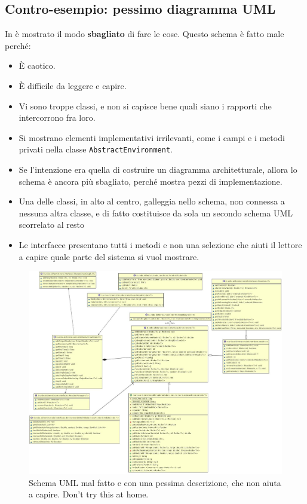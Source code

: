 \documentclass[a4paper,12pt]{report}
\begin{document}
\subsection*{Contro-esempio: pessimo diagramma UML}

In  è mostrato il modo \textbf{sbagliato} di fare le cose.
%
Questo schema è fatto male perché:
\begin{itemize}
	\item È caotico.
	\item È difficile da leggere e capire.
	\item Vi sono troppe classi, e non si capisce bene quali siano i rapporti che intercorrono fra loro.
	\item Si mostrano elementi implementativi irrilevanti, come i campi e i metodi privati nella classe \texttt{AbstractEnvironment}.
	\item Se l'intenzione era quella di costruire un diagramma architetturale, allora lo schema è ancora più sbagliato, perché mostra pezzi di implementazione.
	\item Una delle classi, in alto al centro, galleggia nello schema, non connessa a nessuna altra classe, e di fatto costituisce da sola un secondo schema UML scorrelato al resto
	\item Le interfacce presentano tutti i metodi e non una selezione che aiuti il lettore a capire quale parte del sistema si vuol mostrare.
\end{itemize}


\begin{figure}[h]
\centering{}
\includegraphics[width=\textwidth]{img/badarch}
\caption{Schema UML mal fatto e con una pessima descrizione, che non aiuta a capire. Don't try this at home.}
\label{img:badarch}
\end{figure}
\end{document}
